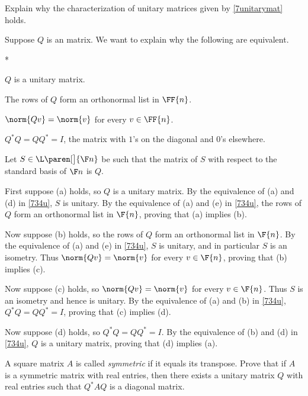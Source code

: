 \exercise
Explain why the characterization of unitary matrices given by \ref{7unitarymat} holds.

\begin{Solution}
Suppose $Q$ is an  matrix. We want to explain why the following are equivalent.
\begin{subtheorem}*
\item
$Q$ is a unitary matrix.
\item
The rows of $Q$ form an orthonormal list in $\FF{n}$.
\item
$\norm{Q v} = \norm{v}$ for every $v \in \FF{n}$.
\item
$Q^*Q = QQ^*= I$, the  matrix with $1$'s on the diagonal and $0$'s elsewhere.
\end{subtheorem}

Let $S \in \L\paren[\big]{\F n}$ be such that the matrix of $S$ with respect to the standard basis of $\F n$ is $Q$.

First suppose (a) holds, so $Q$ is a unitary matrix. By the equivalence of (a) and (d) in \ref{734u}, $S$ is unitary. By the equivalence of (a) and (e) in \ref{734u}, the rows of $Q$ form an orthonormal list in $\F{n}$, proving that (a) implies (b).

Now suppose (b) holds, so the rows of $Q$ form an orthonormal list in $\F{n}$. By the equivalence of (a) and (e) in \ref{734u}, $S$ is unitary, and in particular $S$ is an isometry. Thus $\norm{Q v} = \norm{v}$ for every $v \in \F{n}$, proving that (b) implies (c).

Now suppose (c) holds, so $\norm{Q v} = \norm{v}$ for every $v \in \F{n}$. Thus $S$ is an isometry and hence is unitary. By the equivalence of (a) and (b) in \ref{734u}, $Q^*Q = QQ^*= I$, proving that (c) implies (d).

Now suppose (d) holds, so $Q^*Q = QQ^*= I$. By the equivalence of (b) and (d) in \ref{734u}, $Q$ is a unitary matrix, proving that (d) implies (a).
\end{Solution}

\exercise
A square matrix $A$ is called \textit{symmetric} if it equals its transpose. Prove that if $A$ is a symmetric matrix with real entries, then there exists a unitary matrix $Q$ with real entries such that $Q^* A Q$ is a diagonal matrix.

